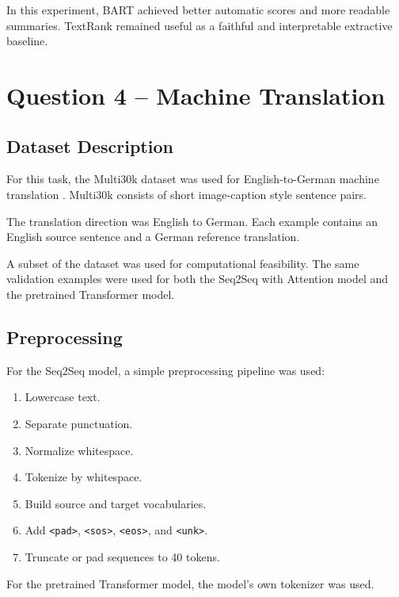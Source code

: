 \documentclass[11pt,a4paper]{article}
\begin{document}
In this experiment, BART achieved better automatic scores and more readable summaries. TextRank remained useful as a faithful and interpretable extractive baseline.

\section{Question 4 -- Machine Translation}

\subsection{Dataset Description}

For this task, the Multi30k dataset was used for English-to-German machine translation \cite{elliott2016multi30k}. Multi30k consists of short image-caption style sentence pairs.

The translation direction was English to German. Each example contains an English source sentence and a German reference translation.

A subset of the dataset was used for computational feasibility. The same validation examples were used for both the Seq2Seq with Attention model and the pretrained Transformer model.

\subsection{Preprocessing}

For the Seq2Seq model, a simple preprocessing pipeline was used:

\begin{enumerate}[leftmargin=*]
    \item Lowercase text.
    \item Separate punctuation.
    \item Normalize whitespace.
    \item Tokenize by whitespace.
    \item Build source and target vocabularies.
    \item Add \texttt{<pad>}, \texttt{<sos>}, \texttt{<eos>}, and \texttt{<unk>}.
    \item Truncate or pad sequences to 40 tokens.
\end{enumerate}

For the pretrained Transformer model, the model's own tokenizer was used.
\end{document}
